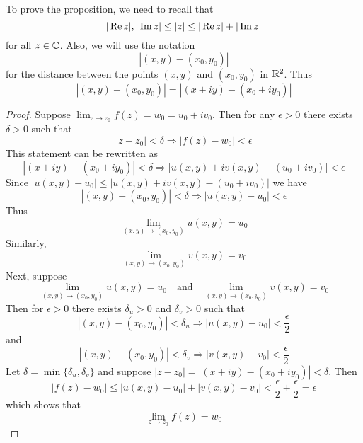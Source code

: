\documentclass[handout]{ximera}
\begin{document}
To prove the proposition, we need to recall that 
\[
|\operatorname{Re} z|, |\operatorname{Im} z| \leq |z| \leq |\operatorname{Re} z| + |\operatorname{Im} z|
\]
for all $z \in \mathbb C$.
Also, we will use the notation 
\[
|(x,y) - (x_0,y_0)|
\]
 for the distance between the points
$(x,y)$ and $(x_0,y_0)$ in $\mathbb R^2$.  Thus
\[
|(x,y) - (x_0,y_0)| = |(x+iy) - (x_0 + iy_0)|
\]
\begin{proof} %
Suppose $\lim_{z \to z_0} f(z) = w_0 = u_0 + iv_0$.
Then for any $\epsilon > 0$ there exists $\delta > 0$ such that
\[
|z-z_0| < \delta \Rightarrow |f(z) - w_0| < \epsilon
\]
This statement can be rewritten as
\[
|(x+iy)-(x_0+i y_0)| < \delta \Rightarrow |u(x,y) + iv(x,y) - (u_0 + iv_0)|< \epsilon
\]
Since $|u(x,y) - u_0| \leq |u(x,y) + iv(x,y) - (u_0 + iv_0)|$
we have
\[
|(x,y)-(x_0, y_0)| < \delta \Rightarrow |u(x,y)  - u_0 |< \epsilon
\]
Thus
\[
\lim_{(x,y) \to (x_0, y_0)} u(x,y) =  u_0 
\]
Similarly, 
\[
\lim_{(x,y) \to (x_0, y_0)} v(x,y) =  v_0 
\]
Next, suppose
\[
\lim_{(x,y) \to (x_0, y_0)} u(x,y) =  u_0  \quad \mbox{and} \quad \lim_{(x,y) \to (x_0, y_0)} v(x,y) =  v_0 
\]
Then for $\epsilon > 0$ there exists $\delta_u > 0$ and $\delta_v > 0$ such that
\[
|(x,y)-(x_0, y_0)| < \delta_u \Rightarrow |u(x,y)  - u_0 |< \frac{\epsilon}{2}
\]
and
\[
|(x,y)-(x_0, y_0)| < \delta_v \Rightarrow |v(x,y)  - v_0 |< \frac{\epsilon}{2}
\]
Let $\delta = \min\{\delta_u, \delta_v\}$ and suppose $|z-z_0| = |(x+iy) - (x_0 + iy_0)| <  \delta$. Then 
\[
|f(z) - w_0| \leq  |u(x,y)  - u_0 | + |v(x,y)  - v_0 | < \frac{\epsilon}{2}+ \frac{\epsilon}{2} = \epsilon
\]
which shows that
\[
\lim_{z \to z_0} f(z) = w_0
\]
\end{proof}
\end{document}
